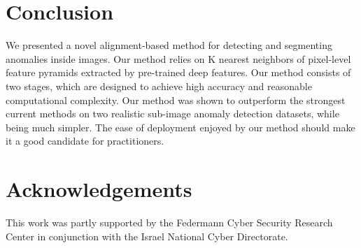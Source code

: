 \documentclass[runningheads]{llncs}
\begin{document}
\section{Conclusion}
\label{sec:conc}

We presented a novel alignment-based method for detecting and segmenting anomalies inside images. Our method relies on K nearest neighbors of pixel-level feature pyramids extracted by pre-trained deep features. Our method consists of two stages, which are designed to achieve high accuracy and reasonable computational complexity. Our method was shown to outperform the strongest current methods on two realistic sub-image anomaly detection datasets, while being much simpler. The ease of deployment enjoyed by our method should make it a good candidate for practitioners. 

\section{Acknowledgements}
 This work was partly supported by the Federmann Cyber Security Research Center in conjunction with the Israel National Cyber Directorate.

\clearpage


\end{document}
